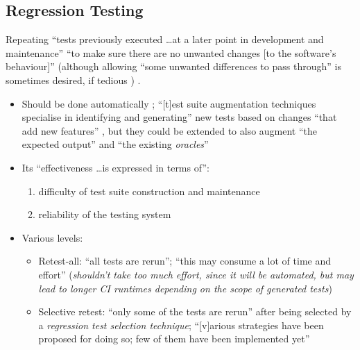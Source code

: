 \subsection{Regression Testing}
\label{chap:notes:sec:regression-testing}

Repeating ``tests previously executed \dots at a later point in development and
maintenance'' \cite[p.~446]{peters_software_2000} ``to make sure there are no
unwanted changes [to the software's behaviour]'' (although allowing ``some
unwanted differences to pass through'' is sometimes desired, if tedious
\cite[p.~482]{peters_software_2000}) \cite[p.~481]{peters_software_2000}.

\begin{itemize}
      \item Should be done automatically \cite[p.~481]{peters_software_2000};
            ``[t]est suite augmentation techniques specialise in
            identifying and generating'' new tests based on changes ``that add
            new features'' , but they could be extended to
            also augment ``the expected output'' and ``the existing
            \emph{oracles}'' \cite[p.~516]{barr_oracle_2015}
      \item Its ``effectiveness \dots is expressed in terms of'':
            \begin{enumerate}
                  \item difficulty of test suite construction and maintenance
                  \item reliability of the testing system
                        \cite[pp.~481-482]{peters_software_2000}
            \end{enumerate}
      \item Various levels:
            \begin{itemize}
                  \item Retest-all: ``all tests are rerun''; ``this may consume
                        a lot of time and effort''
                        \cite[p.~411]{van_vliet_software_2000} (\emph{shouldn't
                              take too much effort, since it will be automated,
                              but may lead to longer CI runtimes depending on
                              the scope of generated tests})
                  \item Selective retest: ``only some of the tests are rerun''
                        after being selected by a \emph{regression test
                              selection technique}; ``[v]arious strategies have
                        been proposed for doing so; few of them have been
                        implemented yet'' \cite[p.~411]{van_vliet_software_2000}
            \end{itemize}
\end{itemize}

